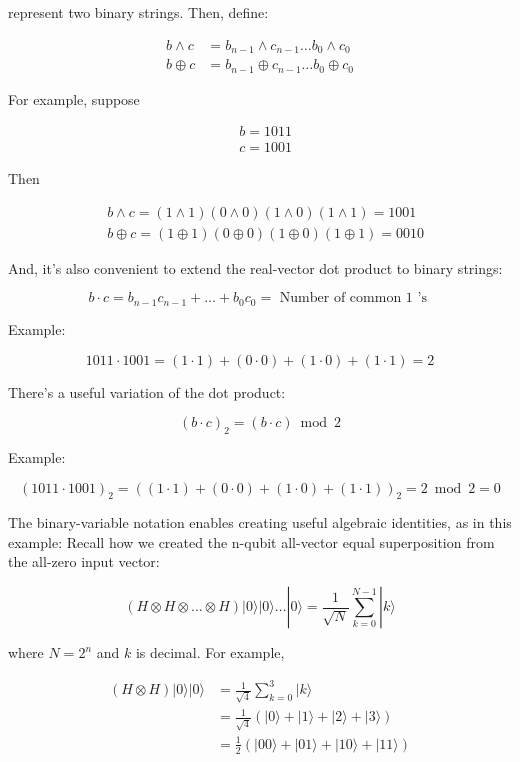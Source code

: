 \documentclass[main.tex]{subfiles}
\begin{document}
    represent two binary strings. Then, define:
    
    $$
    \begin{aligned}
    b \wedge c &=b_{n-1} \wedge c_{n-1} \ldots b_{0} \wedge c_{0} \\
    b \oplus c &=b_{n-1} \oplus c_{n-1} \ldots b_{0} \oplus c_{0}
    \end{aligned}
    $$
    
    For example, suppose
    
    $$
    \begin{aligned}
    &b=1011 \\
    &c=1001
    \end{aligned}
    $$
    
    Then
    
    $$
    \begin{aligned}
    &b \wedge c=(1 \wedge 1)(0 \wedge 0)(1 \wedge 0)(1 \wedge 1)=1001 \\
    &b \oplus c=(1 \oplus 1)(0 \oplus 0)(1 \oplus 0)(1 \oplus 1)=0010
    \end{aligned}
    $$
    
    And, it's also convenient to extend the real-vector dot product to binary strings:
    
    $$
    b \cdot c=b_{n-1} c_{n-1}+\ldots+b_{0} c_{0}=\text { Number of common } 1 \text { 's }
    $$
    
    Example:
    
    $$
    1011 \cdot 1001=(1 \cdot 1)+(0 \cdot 0)+(1 \cdot 0)+(1 \cdot 1)=2
    $$
    
    There's a useful variation of the dot product:
    
    $$
    (b \cdot c)_{2}=(b \cdot c) \bmod 2
    $$
    
    Example:
    
    $$
    (1011 \cdot 1001)_{2}=((1 \cdot 1)+(0 \cdot 0)+(1 \cdot 0)+(1 \cdot 1))_{2}=2 \bmod 2=0
    $$
    
    The binary-variable notation enables creating useful algebraic identities, as in this example: Recall how we created the n-qubit all-vector equal superposition from the all-zero input vector:
    
    $$
    (H \otimes H \otimes \ldots \otimes H)|0\rangle|0\rangle \ldots|0\rangle=\frac{1}{\sqrt{N}} \sum_{k=0}^{N-1}|k\rangle
    $$
    
    where $N=2^{n}$ and $k$ is decimal. For example,
    
    $$
    \begin{aligned}
    (H \otimes H)|0\rangle|0\rangle &=\frac{1}{\sqrt{4}} \sum_{k=0}^{3}|k\rangle \\
    &=\frac{1}{\sqrt{4}}(|0\rangle+|1\rangle+|2\rangle+|3\rangle) \\
    &=\frac{1}{2}(|00\rangle+|01\rangle+|10\rangle+|11\rangle)
    \end{aligned}
    $$
    
\end{document}
